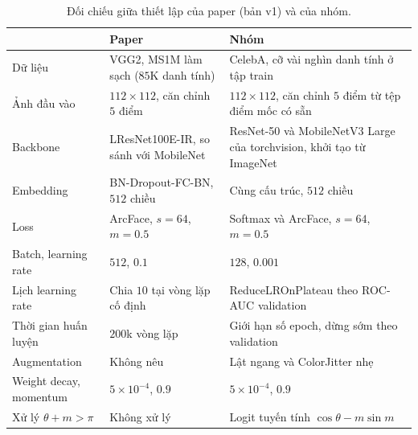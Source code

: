 \documentclass[a4paper,12pt]{article}
\begin{document}
\begin{table}[h]
    \centering
    \caption{Đối chiếu giữa thiết lập của paper (bản v1) và của nhóm.}
    \label{tab:doi-chieu}
    \begin{tabular}{p{3.0cm}p{5.3cm}p{5.3cm}}
        \toprule
                               & Paper                                 & Nhóm                                                                 \\
        \midrule
        Dữ liệu                & VGG2, MS1M làm sạch ($85$K danh tính) & CelebA, cỡ vài nghìn danh tính ở tập train                           \\
        Ảnh đầu vào            & $112\times112$, căn chỉnh $5$ điểm    & $112\times112$, căn chỉnh $5$ điểm từ tệp điểm mốc có sẵn            \\
        Backbone               & LResNet100E-IR, so sánh với MobileNet & ResNet-50 và MobileNetV3 Large của torchvision, khởi tạo từ ImageNet \\
        Embedding              & BN-Dropout-FC-BN, $512$ chiều         & Cùng cấu trúc, $512$ chiều                                           \\
        Loss                   & ArcFace, $s=64$, $m=0.5$              & Softmax và ArcFace, $s=64$, $m=0.5$                                  \\
        Batch, learning rate   & $512$, $0.1$                          & $128$, $0.001$                                                       \\
        Lịch learning rate     & Chia $10$ tại vòng lặp cố định        & ReduceLROnPlateau theo ROC-AUC validation                            \\
        Thời gian huấn luyện   & $200$k vòng lặp                       & Giới hạn số epoch, dừng sớm theo validation                          \\
        Augmentation           & Không nêu                             & Lật ngang và ColorJitter nhẹ                                         \\
        Weight decay, momentum & $5\times10^{-4}$, $0.9$               & $5\times10^{-4}$, $0.9$                                              \\
        Xử lý $\theta+m>\pi$   & Không xử lý                           & Logit tuyến tính $\cos\theta - m\sin m$                              \\
        \bottomrule
    \end{tabular}
\end{table}
\end{document}
